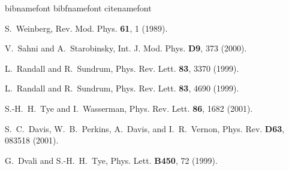\documentclass[a4paper,aps,prl,twocolumn,showpacs]{revtex4}
\begin{document}
\begin{thebibliography}{21}

\expandafter\ifx\csname bibnamefont\endcsname\relax
  \def\bibnamefont#1{#1}\fi
\expandafter\ifx\csname bibfnamefont\endcsname\relax
  \def\bibfnamefont#1{#1}\fi
\expandafter\ifx\csname citenamefont\endcsname\relax
  \def\citenamefont#1{#1}\fi
\providecommand{\bibinfo}[2]{#2}
\providecommand{\eprint}[2][]{\url{#2}}

\bibinfo{author}{\bibfnamefont{S.}~\bibnamefont{Weinberg}},
  \bibinfo{journal}{Rev. Mod. Phys.} \textbf{\bibinfo{volume}{61}},
  \bibinfo{pages}{1} (\bibinfo{year}{1989}).

\bibinfo{author}{\bibfnamefont{V.}~\bibnamefont{Sahni}} \bibnamefont{and}
  \bibinfo{author}{\bibfnamefont{A.}~\bibnamefont{Starobinsky}},
  \bibinfo{journal}{Int. J. Mod. Phys.} \textbf{\bibinfo{volume}{D9}},
  \bibinfo{pages}{373} (\bibinfo{year}{2000}).

\bibinfo{author}{\bibfnamefont{L.}~\bibnamefont{Randall}} \bibnamefont{and}
  \bibinfo{author}{\bibfnamefont{R.}~\bibnamefont{Sundrum}},
  \bibinfo{journal}{Phys. Rev. Lett.} \textbf{\bibinfo{volume}{83}},
  \bibinfo{pages}{3370} (\bibinfo{year}{1999}).

\bibinfo{author}{\bibfnamefont{L.}~\bibnamefont{Randall}} \bibnamefont{and}
  \bibinfo{author}{\bibfnamefont{R.}~\bibnamefont{Sundrum}},
  \bibinfo{journal}{Phys. Rev. Lett.} \textbf{\bibinfo{volume}{83}},
  \bibinfo{pages}{4690} (\bibinfo{year}{1999}).

\bibinfo{author}{\bibfnamefont{S.-H.~H.}~\bibnamefont{Tye}} \bibnamefont{and}
  \bibinfo{author}{\bibfnamefont{I.}~\bibnamefont{Wasserman}},
  \bibinfo{journal}{Phys. Rev. Lett.} \textbf{\bibinfo{volume}{86}},
  \bibinfo{pages}{1682} (\bibinfo{year}{2001}).

\bibinfo{author}{\bibfnamefont{S.~C.}~\bibnamefont{Davis}},
  \bibinfo{author}{\bibfnamefont{W.~B.}~\bibnamefont{Perkins}},
  \bibinfo{author}{\bibfnamefont{A.}~\bibnamefont{Davis}}, \bibnamefont{and}
  \bibinfo{author}{\bibfnamefont{I.~R.}~\bibnamefont{Vernon}},
  \bibinfo{journal}{Phys. Rev.} \textbf{\bibinfo{volume}{D63}},
  \bibinfo{pages}{083518} (\bibinfo{year}{2001}).

\bibinfo{author}{\bibfnamefont{G.}~\bibnamefont{Dvali}} \bibnamefont{and}
  \bibinfo{author}{\bibfnamefont{S.-H.~H.}~\bibnamefont{Tye}},
  \bibinfo{journal}{Phys. Lett.} \textbf{\bibinfo{volume}{B450}},
  \bibinfo{pages}{72} (\bibinfo{year}{1999}).


\end{thebibliography}
\end{document}
